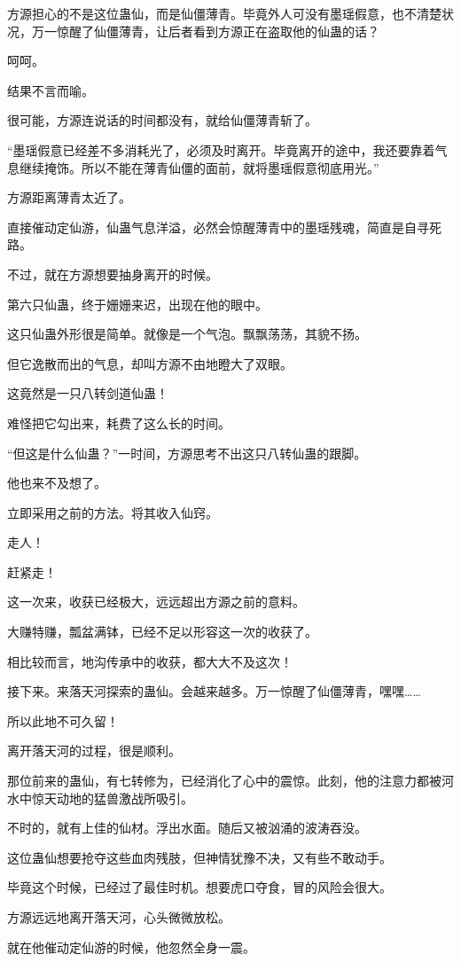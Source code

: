 \begin{this_body}
方源担心的不是这位蛊仙，而是仙僵薄青。毕竟外人可没有墨瑶假意，也不清楚状况，万一惊醒了仙僵薄青，让后者看到方源正在盗取他的仙蛊的话？

呵呵。

结果不言而喻。

很可能，方源连说话的时间都没有，就给仙僵薄青斩了。

“墨瑶假意已经差不多消耗光了，必须及时离开。毕竟离开的途中，我还要靠着气息继续掩饰。所以不能在薄青仙僵的面前，就将墨瑶假意彻底用光。”

方源距离薄青太近了。

直接催动定仙游，仙蛊气息洋溢，必然会惊醒薄青中的墨瑶残魂，简直是自寻死路。

不过，就在方源想要抽身离开的时候。

第六只仙蛊，终于姗姗来迟，出现在他的眼中。

这只仙蛊外形很是简单。就像是一个气泡。飘飘荡荡，其貌不扬。

但它逸散而出的气息，却叫方源不由地瞪大了双眼。

这竟然是一只八转剑道仙蛊！

难怪把它勾出来，耗费了这么长的时间。

“但这是什么仙蛊？”一时间，方源思考不出这只八转仙蛊的跟脚。

他也来不及想了。

立即采用之前的方法。将其收入仙窍。

走人！

赶紧走！

这一次来，收获已经极大，远远超出方源之前的意料。

大赚特赚，瓢盆满钵，已经不足以形容这一次的收获了。

相比较而言，地沟传承中的收获，都大大不及这次！

接下来。来落天河探索的蛊仙。会越来越多。万一惊醒了仙僵薄青，嘿嘿……

所以此地不可久留！

离开落天河的过程，很是顺利。

那位前来的蛊仙，有七转修为，已经消化了心中的震惊。此刻，他的注意力都被河水中惊天动地的猛兽激战所吸引。

不时的，就有上佳的仙材。浮出水面。随后又被汹涌的波涛吞没。

这位蛊仙想要抢夺这些血肉残肢，但神情犹豫不决，又有些不敢动手。

毕竟这个时候，已经过了最佳时机。想要虎口夺食，冒的风险会很大。

方源远远地离开落天河，心头微微放松。

就在他催动定仙游的时候，他忽然全身一震。


\end{this_body}
